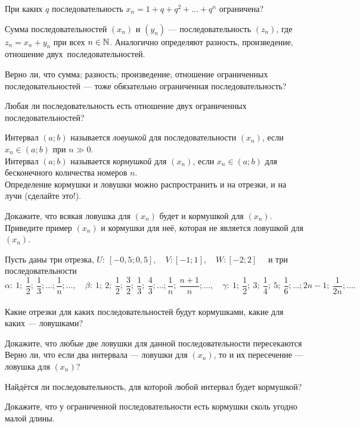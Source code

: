 \documentclass[a4paper,11pt]{article}
\begin{document}
 При каких $q$ последовательность $x_n=1+q+q^2+\ldots+q^n$
ограничена?

 Сумма последовательностей $(x_n)$ и $(y_n)$ ---
последовательность $(z_n)$, где $z_n=x_n+y_n$
при всех $n\in\mathbb{N}$. Аналогично определяют %
разность,
произведение, отношение двух~\hbox{последовательностей.}

 Верно ли, что
 сумма;
 разность;
 произведение;
 отношение ограниченных
последовательностей --- тоже обязательно ограниченная последовательность?

 Любая ли последовательность есть отношение двух ограниченных последовательностей?


Интервал $(a;b)$ называется {\it ловушкой} для последовательности $(x_n)$, если $x_n\in (a;b)$ при $n\gg0$.\\
Интервал $(a;b)$ называется {\it кормушкой} для $(x_n)$, если $x_n\in (a;b)$ для бесконечного количества номеров $n$.\\
Определение кормушки и ловушки можно распространить и на отрезки, и на лучи (сделайте это!).

 Докажите, что всякая ловушка для $(x_n)$ будет и кормушкой для $(x_n)$.\\
 Приведите пример $(x_n)$ и кормушки для неё, которая не является ловушкой для $(x_n)$.


Пусть даны три отрезка, $U:\ [-0,5;0,5], \quad V: [-1;1], \quad W: [-2;2]$ \ \ и три последовательности\\
$$\alpha: \ 1;\ \frac12;\ \frac13;\ldots;\frac1n;\ldots,\quad
\beta:\  1;\ 2;\ \frac12;\ \frac32;\ \frac13;\ \frac43;\ldots;\frac1n;\ \frac{n+1}n;\ldots,\quad
\gamma:\ 1;\ \frac12;\ 3;\ \frac14;\ 5;\ \frac16;\ldots;2n-1;\ \frac1{2n};\ldots.
$$\\
Какие отрезки для каких последовательностей будут кормушками, какие для каких --- ловушками?

 Докажите, что любые две ловушки для данной последовательности пересекаются\\
 Верно ли, что если два интервала --- ловушки для $(x_n)$, то и их пересечение --- ловушка для $(x_n)$?

Найдётся ли последовательность, для которой любой интервал будет кормушкой?


Докажите, что у ограниченной последовательности есть кормушки сколь угодно малой длины.
\end{document}
